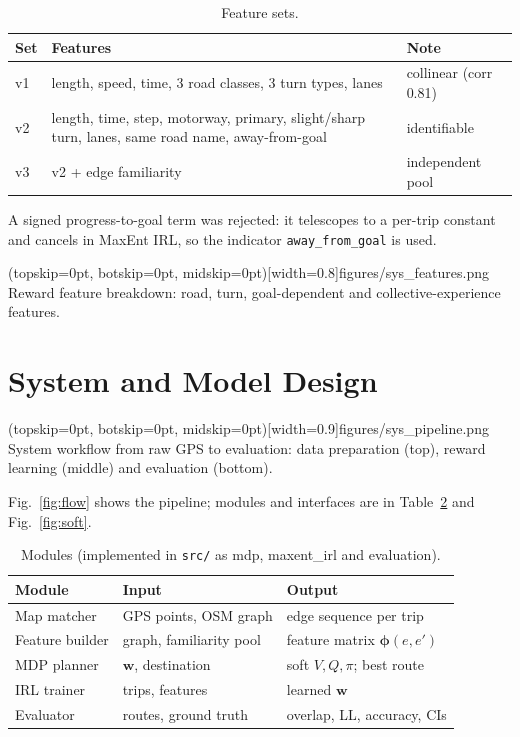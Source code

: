 \documentclass{ieeeaccess}
\newcommand{\bphi}{\boldsymbol{\phi}}
\newcommand{\bw}{\mathbf{w}}
\begin{document}
\begin{table}[t]
\centering\footnotesize
\caption{Feature sets.}\label{tab:feat}
\begin{tabular}{@{}>{\raggedright\arraybackslash}p{0.8cm}>{\raggedright\arraybackslash}p{4.7cm}>{\raggedright\arraybackslash}p{2.0cm}@{}}
\toprule
Set & Features & Note\\
\midrule
v1 & length, speed, time, 3 road classes, 3 turn types, lanes & collinear (corr 0.81)\\
v2 & length, time, step, motorway, primary, slight/sharp turn, lanes, same road name, away-from-goal & identifiable\\
v3 & v2 + edge familiarity & independent pool\\
\bottomrule
\end{tabular}
\end{table}
A signed progress-to-goal term was rejected: it telescopes to a per-trip constant and cancels in MaxEnt IRL, so the indicator \texttt{away\_from\_goal} is used.

\Figure[t!](topskip=0pt, botskip=0pt, midskip=0pt)[width=0.8\columnwidth]{figures/sys_features.png}
{Reward feature breakdown: road, turn, goal-dependent and collective-experience features.\label{fig:feat}}

\section{System and Model Design}\label{sec:system}
\Figure[t!](topskip=0pt, botskip=0pt, midskip=0pt)[width=0.9\textwidth]{figures/sys_pipeline.png}
{System workflow from raw GPS to evaluation: data preparation (top), reward learning (middle) and evaluation (bottom).\label{fig:flow}}

Fig.~\ref{fig:flow} shows the pipeline; modules and interfaces are in Table~\ref{tab:modules} and Fig.~\ref{fig:soft}.

\begin{table}[t]
\centering\footnotesize
\caption{Modules (implemented in \texttt{src/} as mdp, maxent\_irl and evaluation).}\label{tab:modules}
\begin{tabular}{@{}p{1.9cm}p{2.6cm}p{2.7cm}@{}}
\toprule
Module & Input & Output\\
\midrule
Map matcher & GPS points, OSM graph & edge sequence per trip\\
Feature builder & graph, familiarity pool & feature matrix $\bphi(e,e')$\\
MDP planner & $\bw$, destination & soft $V,Q,\pi$; best route\\
IRL trainer & trips, features & learned $\bw$\\
Evaluator & routes, ground truth & overlap, LL, accuracy, CIs\\
\bottomrule
\end{tabular}
\end{table}
\end{document}
